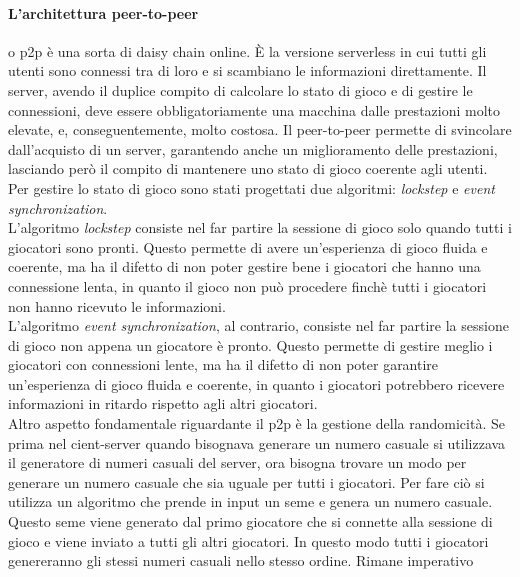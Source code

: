         \paragraph{L'architettura peer-to-peer} o p2p è una sorta di daisy chain online. È la versione serverless in cui tutti gli utenti sono connessi tra di loro e si scambiano le 
            informazioni direttamente. Il server, avendo il duplice compito di calcolare lo stato di gioco e di gestire le connessioni, deve essere obbligatoriamente una macchina 
            dalle prestazioni molto elevate, e, conseguentemente, molto costosa. Il peer-to-peer permette di svincolare dall'acquisto di un server, garantendo anche un miglioramento 
            delle prestazioni, lasciando però il compito di mantenere uno stato di gioco coerente agli utenti.\\
            Per gestire lo stato di gioco sono stati progettati due algoritmi: \textit{lockstep} e \textit{event synchronization}.\\
            L'algoritmo \textit{lockstep} consiste nel far partire la sessione di gioco solo quando tutti i giocatori sono pronti. Questo permette di avere un'esperienza di gioco
            fluida e coerente, ma ha il difetto di non poter gestire bene i giocatori che hanno una connessione lenta, in quanto il gioco non può procedere finchè tutti i giocatori
            non hanno ricevuto le informazioni.\\
            L'algoritmo \textit{event synchronization}, al contrario, consiste nel far partire la sessione di gioco non appena un giocatore è pronto. Questo permette di gestire meglio
            i giocatori con connessioni lente, ma ha il difetto di non poter garantire un'esperienza di gioco fluida e coerente, in quanto i giocatori potrebbero ricevere informazioni 
            in ritardo rispetto agli altri giocatori.\\
            Altro aspetto fondamentale riguardante il p2p è la gestione della randomicità. Se prima nel cient-server quando bisognava generare un numero casuale si utilizzava il
            generatore di numeri casuali del server, ora bisogna trovare un modo per generare un numero casuale che sia uguale per tutti i giocatori.
            Per fare ciò si utilizza un algoritmo che prende in input un seme e genera un numero casuale. Questo seme viene generato dal primo giocatore che si connette alla sessione
            di gioco e viene inviato a tutti gli altri giocatori. In questo modo tutti i giocatori genereranno gli stessi numeri casuali nello stesso ordine. Rimane imperativo 
